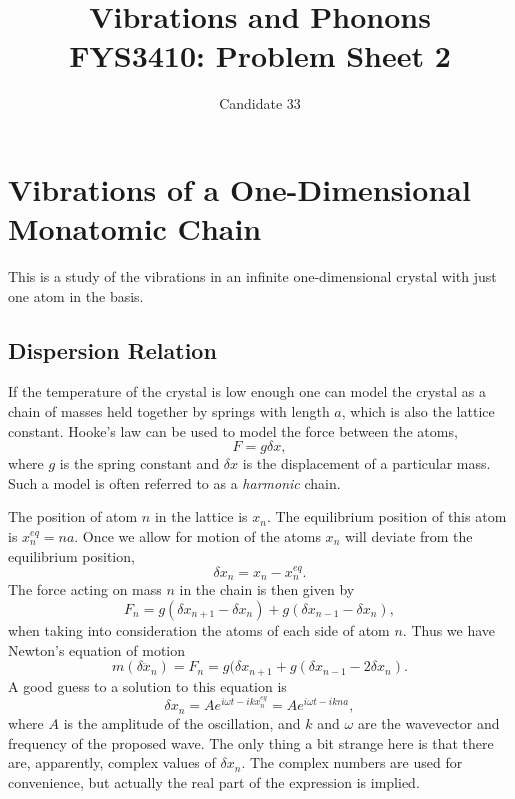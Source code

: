 \documentclass[11pt]{amsart}
\title[Vibrations and Phonons]{Vibrations and Phonons \\
		\hrulefill \small{ FYS3410: Problem Sheet 2 } \hrulefill}
\author{Candidate 33}
\begin{document}
\maketitle

\section{Vibrations of a One-Dimensional Monatomic Chain}
This is a study of the vibrations in an infinite one-dimensional crystal with just one atom in  the basis. 

\subsection{Dispersion Relation}
If the temperature of the  crystal is low enough one can model the crystal as a chain of masses held together by springs with length $a$, which is also the lattice constant. Hooke's law can be used to model the force between the atoms,
\begin{equation}
F = g\delta x,
\end{equation}
where $g$ is the spring constant and $\delta x$ is the displacement of a particular mass. Such a model is often referred to as a \emph{harmonic} chain.

The position of atom $n$ in the lattice is $x_n$. The equilibrium position of this atom is $x_n^{eq} = na$. Once we allow for motion of the atoms $x_n$ will deviate from the equilibrium position,
\begin{equation}
\delta x_n = x_n - x_n^{eq}.
\end{equation}
The force acting on mass $n$ in the chain is then given by
\begin{equation}
F_n = g(\delta x_{n+1} - \delta x_n) + g(\delta x_{n-1} - \delta x_n),
\end{equation}
when taking into consideration the atoms of each side of atom $n$. Thus we have Newton's equation of motion
\begin{equation}
\label{eq:N2L}
m(\delta \ddot{x}_n) = F_n = g(\delta x_{n+1} + g(\delta x_{n-1} - 2\delta x_n).
\end{equation}
A good guess to a solution to this equation is
\begin{equation}
\label{eq:oscillatorsolution}
\delta x_n = Ae^{i\omega t - ikx_n^{eq}}=Ae^{i\omega t - ikna},
\end{equation}
where $A$ is the amplitude of the oscillation, and $k$ and $\omega$ are the wavevector and frequency of the proposed wave. The only thing a bit strange here is that there are, apparently, complex values of $\delta x_n$. The complex numbers are used for convenience, but actually the real part of the expression is implied.
\end{document}
